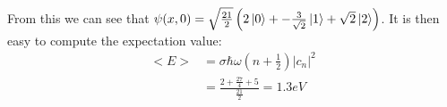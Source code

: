 \documentclass[10pt]{article} %
\begin{document}
From this we can see that $\psi(x,0) = \sqrt{\frac{21}{2}}
\left(2\ket{0} + -\frac{3}{\sqrt{2}}\ket{1} + \sqrt{2}\ket{2}\right)$. It is then easy to compute
the expectation value: \\

\begin{align*}
  <E> &= \sigma \hbar\omega\left(n+\frac{1}{2}\right)|c_n|^2\\
  &= \frac{2 + \frac{27}{4} + 5}{\frac{21}{2}} = 1.3 eV\\
\end{align*}
\end{document}
